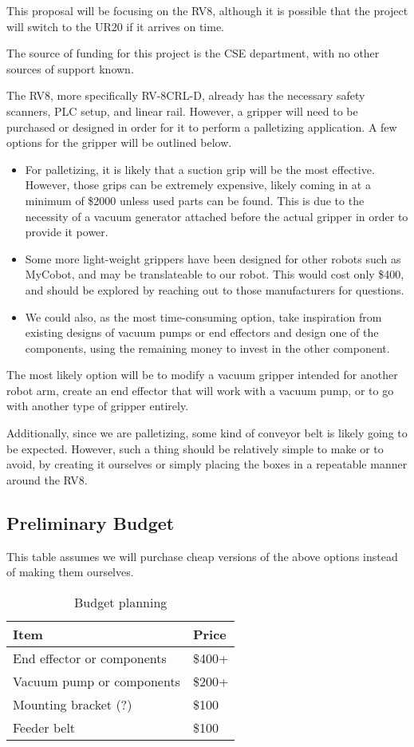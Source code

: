 This proposal will be focusing on the RV8, although it is possible that the project will switch to the UR20 if it arrives on time.

The source of funding for this project is the CSE department, with no other sources of support known.

The RV8, more specifically RV-8CRL-D, already has the necessary safety scanners, PLC setup, and linear rail. However, a gripper will need to be purchased or designed in order for it to perform a palletizing application. A few options for the gripper will be outlined below.

\begin{itemize}
    \item For palletizing, it is likely that a suction grip will be the most effective. However, those grips can be extremely expensive, likely coming in at a minimum of \$2000 unless used parts can be found. This is due to the necessity of a vacuum generator attached before the actual gripper in order to provide it power.
    \item Some more light-weight grippers have been designed for other robots such as MyCobot, and may be translateable to our robot. This would cost only \$400, and should be explored by reaching out to those manufacturers for questions.
    \item We could also, as the most time-consuming option, take inspiration from existing designs of vacuum pumps or end effectors and design one of the components, using the remaining money to invest in the other component. 
\end{itemize}

The most likely option will be to modify a vacuum gripper intended for another robot arm, create an end effector that will work with a vacuum pump, or to go with another type of gripper entirely.

Additionally, since we are palletizing, some kind of conveyor belt is likely going to be expected. However, such a thing should be relatively simple to make or to avoid, by creating it ourselves or simply placing the boxes in a repeatable manner around the RV8.

\subsection{Preliminary Budget}
This table assumes we will purchase cheap versions of the above options instead of making them ourselves.
\begin{table}[H]
\centering
    \caption{Budget planning}
    \begin{tabular}{|l|l|}
        \hline
        \textbf{Item} & \textbf{Price} \\ \hline
        End effector or components & \$400+ \\ \hline
        Vacuum pump  or components & \$200+ \\ \hline
        Mounting bracket (?) & \$100 \\ \hline
        Feeder belt & \$100 \\ \hline
    \end{tabular}
\end{table}



